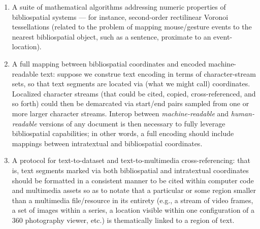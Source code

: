 {\begin{enumerate}[leftmargin=2pt, itemsep=-1pt]
\item{} A suite of mathematical algorithms addressing numeric 
properties of bibliospatial systems --- for instance, second-order 
rectilinear Voronoi tessellations (related to the problem 
of mapping mouse/gesture events to the nearest bibliospatial object, 
such as a sentence, proximate to an event-location). 

\item{} A full mapping between bibliospatial coordinates and encoded 
machine-readable text: suppose we construe text encoding in terms 
of character-stream sets, so that text segments are located via 
(what we might call)  coordinates.  Localized character 
streams (that could be cited, copied, cross-referenced, and so forth) 
could then be demarcated via start/end pairs sampled from one or 
more larger character streams.  Interop between \textit{machine-readable} 
and \textit{human-readable} versions of any document is then necessary 
to fully leverage bibliospatial capabilities; in other 
words, a full encoding should include mappings between 
intratextual and bibliospatial coordinates.  

\item{} A protocol for text-to-dataset and text-to-multimedia 
cross-referencing: that is, text segments marked via both 
bibliospatial and intratextual coordinates should be 
formatted in a consistent manner to be cited within computer 
code and multimedia assets so as to notate that a particular 
 or some region smaller than a multimedia file/resource 
in its entirety (e.g., a stream of video frames, a set of 
images within a series, a location visible within one configuration 
of a 360\textdegree{} photography viewer, etc.) is thematically 
linked to a region of text.   

\end{enumerate}
}

